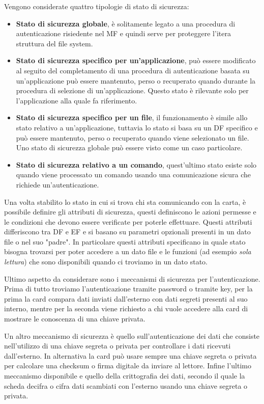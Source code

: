Vengono considerate quattro tipologie di stato di sicurezza:
\begin{itemize}
    \item \textbf{Stato di sicurezza globale}, è solitamente legato a una procedura di autenticazione risiedente nel MF e quindi serve per proteggere l'itera struttura del file system.
    \item \textbf{Stato di sicurezza specifico per un'applicazione}, può essere modificato al seguito del completamento di una procedura di autenticazione basata su un'applicazione può essere mantenuto, perso o recuperato quando durante la procedura di selezione di un'applicazione. Questo stato è rilevante solo per l'applicazione alla quale fa riferimento.
    \item \textbf{Stato di sicurezza specifico per un file}, il funzionamento è simile allo stato relativo a un'applicazione, tuttavia lo stato si basa su un DF specifico e può essere mantenuto, perso o recuperato quando viene selezionato un file. Uno stato di sicurezza globale può essere visto come un caso particolare.
    \item \textbf{Stato di sicurezza relativo a un comando}, quest'ultimo stato esiste solo quando viene processato un comando usando una comunicazione sicura che richiede un'autenticazione.
\end{itemize}

Una volta stabilito lo stato in cui si trova chi sta comunicando con la carta, è possibile definire gli attributi di sicurezza, questi definiscono le azioni permesse e le condizioni che devono essere verificate per poterle effettuare. Questi attributi differiscono tra DF e EF e si basano su parametri opzionali presenti in un dato file o nel suo "padre". In particolare questi attributi specificano in quale stato bisogna trovarsi per poter accedere a un dato file e le funzioni (ad esempio \textit{sola lettura}) che sono disponibili quando ci troviamo in un dato stato.

Ultimo aspetto da considerare sono i meccanismi di sicurezza per l'autenticazione. Prima di tutto troviamo l'autenticazione tramite password o tramite key, per la prima la card compara dati inviati dall'esterno con dati segreti presenti al suo interno, mentre per la seconda viene richiesto a chi vuole accedere alla card di mostrare le conoscenza di una chiave privata.

Un altro meccanismo di sicurezza è quello sull'autenticazione dei dati che consiste nell'utilizzo di una chiave segreta o privata per controllare i dati ricevuti dall'esterno. In alternativa la card può usare sempre una chiave segreta o privata per calcolare una checksum o firma digitale da inviare al lettore. Infine l'ultimo meccanismo disponibile e quello della crittografia dei dati, secondo il quale la scheda decifra o cifra dati scambiati con l'esterno usando una chiave segreta o privata.

